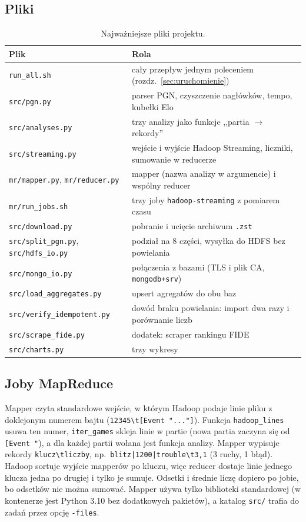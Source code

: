 \documentclass[11pt,a4paper]{article}
\newcommand{\kod}[1]{\texttt{#1}}
\begin{document}
\subsection{Pliki}
\begin{table}[H]
\centering
\caption{Najważniejsze pliki projektu.}\label{tab:pliki}
\small
\begin{tabular}{p{}p{}}
\toprule
Plik & Rola \\
\midrule
\kod{run\_all.sh} & cały przepływ jednym poleceniem (rozdz.~\ref{sec:uruchomienie}) \\
\kod{src/pgn.py} & parser PGN, czyszczenie nagłówków, tempo, kubełki Elo \\
\kod{src/analyses.py} & trzy analizy jako funkcje ,,partia $\to$ rekordy'' \\
\kod{src/streaming.py} & wejście i wyjście Hadoop Streaming, liczniki, sumowanie w reducerze \\
\kod{mr/mapper.py}, \kod{mr/reducer.py} & mapper (nazwa analizy w argumencie) i wspólny reducer \\
\kod{mr/run\_jobs.sh} & trzy joby \kod{hadoop-streaming} z pomiarem czasu \\
\kod{src/download.py} & pobranie i ucięcie archiwum \kod{.zst} \\
\kod{src/split\_pgn.py}, \kod{src/hdfs\_io.py} & podział na 8 części, wysyłka do HDFS bez powielania \\
\kod{src/mongo\_io.py} & połączenia z bazami (TLS i plik CA, \kod{mongodb+srv}) \\
\kod{src/load\_aggregates.py} & upsert agregatów do obu baz \\
\kod{src/verify\_idempotent.py} & dowód braku powielania: import dwa razy i porównanie liczb \\
\kod{src/scrape\_fide.py} & dodatek: scraper rankingu FIDE \\
\kod{src/charts.py} & trzy wykresy \\
\bottomrule
\end{tabular}
\end{table}

\subsection{Joby MapReduce}
Mapper czyta standardowe wejście, w którym Hadoop podaje linie pliku z doklejonym numerem bajtu (\kod{12345\textbackslash t[Event "..."]}). Funkcja \kod{hadoop\_lines} usuwa ten numer, \kod{iter\_games} skleja linie w partie (nowa partia zaczyna się od \kod{[Event "}), a dla każdej partii wołana jest funkcja analizy. Mapper wypisuje rekordy \kod{klucz\textbackslash tliczby}, np.\ \kod{blitz|1200|trouble\textbackslash t3,1} (3 ruchy, 1 błąd). Hadoop sortuje wyjście mapperów po kluczu, więc reducer dostaje linie jednego klucza jedna po drugiej i tylko je sumuje. Odsetki i średnie liczę dopiero po jobie, bo odsetków nie można sumować. Mapper używa tylko biblioteki standardowej (w kontenerze jest Python 3.10 bez dodatkowych pakietów), a katalog \kod{src/} trafia do zadań przez opcję \kod{-files}.
\end{document}
